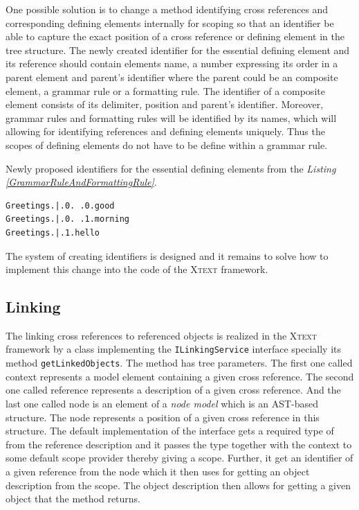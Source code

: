 \documentclass[12pt,notitlepage,a4paper]{report}
\begin{document}
One possible solution is to change a method  identifying cross references and corresponding defining elements internally for scoping so that an identifier be able to capture the exact position of a cross reference or defining element in the tree structure. The newly created identifier for the essential defining element and its reference should contain elements name, a number expressing its order in a parent element and parent's identifier where the parent could be an composite element, a grammar rule or a formatting rule. The identifier of a composite element consists of its delimiter, position and parent's identifier. Moreover, grammar rules and formatting rules will be identified by its names, which will allowing for identifying references and defining elements uniquely. Thus the scopes of defining elements  do not have to be define within a grammar rule.

\begin{expl}\label{IdentifiersFormattingElements}
Newly proposed identifiers for the essential defining elements from the \textit{Listing \ref{GrammarRuleAndFormattingRule}}.
\begingroup
\fontsize{10pt}{12pt}
\begin{Verbatim}[commandchars=\\\{\}]
Greetings.|.0. .0.good
Greetings.|.0. .1.morning
Greetings.|.1.hello 
\end{Verbatim}
\endgroup
\end{expl}

The system of creating identifiers is designed and it remains to solve how to implement this change into the code of the \textsc{Xtext} framework.

\subsection{Linking}

The linking cross references to referenced objects is realized in the \textsc{Xtext} framework by a class implementing the \texttt{ILinkingService} interface specially its method \texttt{getLinkedObjects}. The method has tree parameters. The first one called context represents a model element containing a given cross reference. The second one called reference represents a description of a given cross reference. And the last one called node is an element of a \textit{node model} which is an AST-based structure. The node represents a position of a given cross reference in this structure.  The default implementation of the interface gets a required type of from the reference description and it passes the type together with the context to some default scope provider thereby giving a scope. Further, it get an identifier of a given reference from the node which it then uses for getting an object description from the scope. The object description then allows for getting a given object that the method returns.
\end{document}
